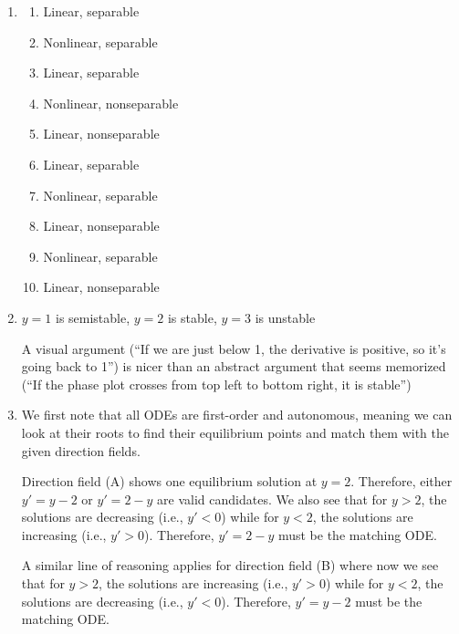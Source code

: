\begin{enumerate}
    \item 

        \begin{enumerate}
        \begin{enumerate}
            \item Linear, separable
            \item Nonlinear, separable
            \item Linear, separable
            \item Nonlinear, nonseparable
            \item Linear, nonseparable
            \item Linear, separable
            \item Nonlinear, separable
            \item Linear, nonseparable
            \item Nonlinear, separable
            \item Linear, nonseparable
            
        \end{enumerate}
        \end{enumerate} 
    \item 
    $y=1$ is semistable,
    $y=2$ is stable,
    $y=3$ is unstable
    
    A visual argument (``If we are just below 1, the derivative is positive, so it's going back to 1'') is nicer than an abstract argument that seems memorized (``If the phase plot crosses from top left to bottom right, it is stable'')

    \item 
    We first note that all ODEs are first-order and autonomous, meaning we can look at their roots to find their equilibrium points and match them with the given direction fields. 
    
    Direction field (A) shows one equilibrium solution at $y = 2$. Therefore, either $y' = y - 2$ or $y'= 2 - y$ are valid candidates. We also see that for $y > 2$, the solutions are decreasing (i.e., $y' < 0$) while for $y < 2$, the solutions are increasing (i.e., $y' > 0$). Therefore, $y' = 2 - y$ must be the matching ODE.
    
    A similar line of reasoning applies for direction field (B) where now we see that for $y > 2$, the solutions are increasing (i.e., $y' > 0$) while for $y < 2$, the solutions are decreasing (i.e., $y' < 0$). Therefore, $y' = y - 2$ must be the matching ODE.
    

\end{enumerate}

